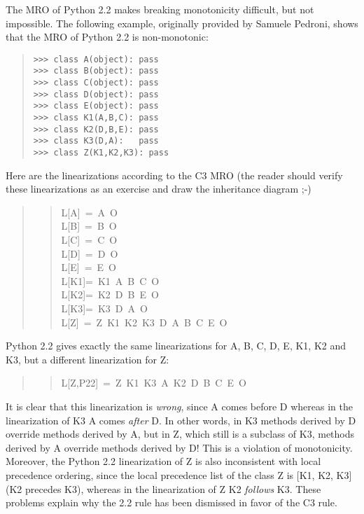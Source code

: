 \documentclass[10pt,a4paper,english]{article}
\begin{document}
The MRO of Python 2.2 makes breaking monotonicity difficult, but not
impossible.  The following example, originally provided by Samuele
Pedroni, shows that the MRO of Python 2.2 is non-monotonic:
\begin{quote}
\begin{verbatim}>>> class A(object): pass
>>> class B(object): pass
>>> class C(object): pass
>>> class D(object): pass
>>> class E(object): pass
>>> class K1(A,B,C): pass
>>> class K2(D,B,E): pass
>>> class K3(D,A):   pass
>>> class Z(K1,K2,K3): pass\end{verbatim}
\end{quote}

Here are the linearizations according to the C3 MRO (the reader should
verify these linearizations as an exercise and draw the inheritance
diagram ;-)
\begin{quote}
\begin{quote}{\ttfamily \raggedright \noindent
L{[}A]~=~A~O~\\
L{[}B]~=~B~O~\\
L{[}C]~=~C~O~\\
L{[}D]~=~D~O~\\
L{[}E]~=~E~O~\\
L{[}K1]=~K1~A~B~C~O~\\
L{[}K2]=~K2~D~B~E~O~\\
L{[}K3]=~K3~D~A~O~\\
L{[}Z]~=~Z~K1~K2~K3~D~A~B~C~E~O
}\end{quote}
\end{quote}

Python 2.2 gives exactly the same linearizations for A, B, C, D, E, K1,
K2 and K3, but a different linearization for Z:
\begin{quote}
\begin{quote}{\ttfamily \raggedright \noindent
L{[}Z,P22]~=~Z~K1~K3~A~K2~D~B~C~E~O
}\end{quote}
\end{quote}

It is clear that this linearization is \emph{wrong}, since A comes before D
whereas in the linearization of K3 A comes \emph{after} D. In other words, in
K3 methods derived by D override methods derived by A, but in Z, which
still is a subclass of K3, methods derived by A override methods derived
by D!  This is a violation of monotonicity.  Moreover, the Python 2.2
linearization of Z is also inconsistent with local precedence ordering,
since the local precedence list of the class Z is {[}K1, K2, K3] (K2
precedes K3), whereas in the linearization of Z K2 \emph{follows} K3.  These
problems explain why the 2.2 rule has been dismissed in favor of the C3
rule.
\end{document}
